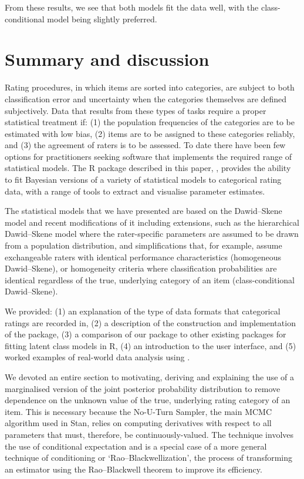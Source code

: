 From these results, we see that both models fit the data well, with the
class-conditional model being slightly preferred.

\hypertarget{sec:summary}{%
\section{Summary and discussion}\label{sec:summary}}

Rating procedures, in which items are sorted into categories, are subject to both
classification error and uncertainty when the categories themselves are defined
subjectively. Data that results from these types of tasks require a proper
statistical treatment if: (1) the population frequencies of the categories are
to be estimated with low bias, (2) items are to be assigned to these
categories reliably, and (3) the agreement of raters is to be assessed.
To date there have been few options for practitioners seeking software that
implements the required range of statistical models. The R package described in
this paper, , provides the ability to fit
Bayesian versions of a variety of statistical models to categorical rating
data, with a range of tools to extract and visualise parameter estimates.

The statistical models that we have presented are based on the Dawid--Skene
model and recent modifications of it including extensions, such as the
hierarchical Dawid--Skene model where the rater-specific parameters are assumed
to be drawn from a population distribution, and simplifications that, for
example, assume exchangeable raters with identical performance characteristics
(homogeneous Dawid--Skene), or homogeneity criteria where classification
probabilities are identical regardless of the true, underlying category of an
item (class-conditional Dawid--Skene).

We provided: (1) an explanation of the type of data formats that categorical
ratings are recorded in, (2) a description of the construction and implementation of the
package, (3) a comparison of our package to other existing packages for fitting
latent class models in R, (4) an introduction to the user interface,
and (5) worked examples of real-world data analysis using .

We devoted an entire section to motivating, deriving and explaining the use of
a marginalised version of the joint posterior probability distribution to
remove dependence on the unknown value of the true, underlying rating category
of an item. This is necessary because the No-U-Turn Sampler, the main MCMC algorithm
used in Stan, relies on computing derivatives with respect to all parameters that
must, therefore, be continuously-valued. The technique involves the use of
conditional expectation and is a special case of a more general technique of
conditioning or `Rao--Blackwellization', the process of transforming an
estimator using the Rao--Blackwell theorem to improve its efficiency.

